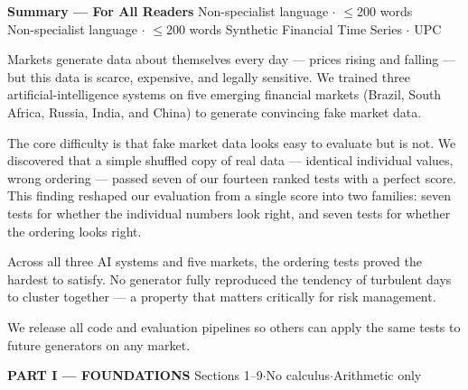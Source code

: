 \documentclass[10pt]{article}
\newcommand{\pagehead}[2]{%
  \begin{tcolorbox}[enhanced,arc=0pt,outer arc=0pt,boxrule=0pt,
    colback=Navy,colframe=Navy,
    top=5pt,bottom=5pt,left=8pt,right=8pt,
    before skip=0pt,after skip=10pt]
  {\color{white}\large\bfseries #1}%
  \ifx\relax#2\relax\else\\[1pt]{\color{blue!30!white}\small #2}\fi
  \hfill{\color{blue!20!white}\footnotesize Synthetic Financial Time Series $\cdot$ UPC}
  \end{tcolorbox}}
\begin{document}

\pagehead{Summary --- For All Readers}
         {Non-specialist language $\cdot$ $\leq$200 words}

\begin{tcolorbox}[enhanced,arc=4pt,boxrule=1pt,colframe=Teal,colback=TealBg,
  top=6pt,bottom=6pt,left=8pt,right=8pt,before skip=4pt,after skip=8pt]
\small
Markets generate data about themselves every day --- prices rising and falling --- but this data is scarce, expensive, and legally sensitive.
We trained three artificial-intelligence systems on five emerging financial markets (Brazil, South Africa, Russia, India, and China) to generate convincing fake market data.

The core difficulty is that fake market data looks easy to evaluate but is not.
We discovered that a simple shuffled copy of real data --- identical individual values, wrong ordering --- passed seven of our fourteen ranked tests with a perfect score.
This finding reshaped our evaluation from a single score into two families: seven tests for whether the individual numbers look right, and seven tests for whether the ordering looks right.

Across all three AI systems and five markets, the ordering tests proved the hardest to satisfy.
No generator fully reproduced the tendency of turbulent days to cluster together --- a property that matters critically for risk management.

We release all code and evaluation pipelines so others can apply the same tests to future generators on any market.
\end{tcolorbox}

\vspace{4pt}
\begin{tcolorbox}[enhanced,arc=0pt,outer arc=0pt,boxrule=0pt,
  colback=Navy!10,colframe=Navy!10,top=3pt,bottom=3pt,left=8pt,right=8pt]
{\large\bfseries\color{Navy} PART I --- FOUNDATIONS}
\hfill{\small\color{Navy!70} Sections 1--9\quad$\cdot$\quad No calculus\quad$\cdot$\quad Arithmetic only}
\end{tcolorbox}
\end{document}
